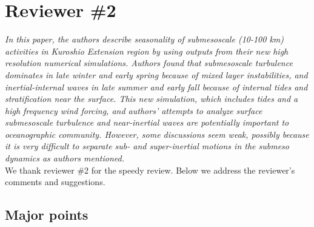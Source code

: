 \documentclass[11pt]{article}
\begin{document}
%
%

\section{Reviewer \#2}
{\it In this paper, the authors describe seasonality of submesoscale (10-100 km)
activities in Kuroshio Extension region by using outputs from their new high
resolution numerical simulations. Authors found that submesoscale turbulence
dominates in late winter and early spring because of mixed layer instabilities, and
inertial-internal waves in late summer and early fall because of internal tides and
stratification near the surface. This new simulation, which includes tides and a high
frequency wind forcing, and authors' attempts to analyze surface submesoscale
turbulence and near-inertial waves are potentially important to oceanographic
community. However, some discussions seem weak, possibly because it is very
difficult to separate sub- and super-inertial motions in the submeso dynamics as
authors mentioned.}\\

We thank reviewer \#2 for the speedy review. Below we address the reviewer’s
comments and suggestions.

\subsection{Major points}
\end{document}
